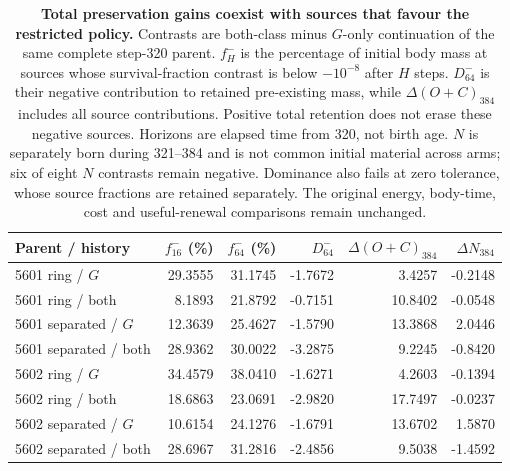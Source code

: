 \begin{table}[htbp]
\centering\small
\setlength{\tabcolsep}{4pt}
\begin{tabular}{lrrrrr}
\toprule
Parent / history & $f^-_{16}$ (\%) & $f^-_{64}$ (\%) & $D^-_{64}$ & $\Delta(O+C)_{384}$ & $\Delta N_{384}$ \\
\midrule
5601 ring / $G$ & 29.3555 & 31.1745 & -1.7672 & 3.4257 & -0.2148 \\
5601 ring / both & 8.1893 & 21.8792 & -0.7151 & 10.8402 & -0.0548 \\
5601 separated / $G$ & 12.3639 & 25.4627 & -1.5790 & 13.3868 & 2.0446 \\
5601 separated / both & 28.9362 & 30.0022 & -3.2875 & 9.2245 & -0.8420 \\
5602 ring / $G$ & 34.4579 & 38.0410 & -1.6271 & 4.2603 & -0.1394 \\
5602 ring / both & 18.6863 & 23.0691 & -2.9820 & 17.7497 & -0.0237 \\
5602 separated / $G$ & 10.6154 & 24.1276 & -1.6791 & 13.6702 & 1.5870 \\
5602 separated / both & 28.6967 & 31.2816 & -2.4856 & 9.5038 & -1.4592 \\
\bottomrule
\end{tabular}
\caption{\textbf{Total preservation gains coexist with sources that favour the restricted policy.} Contrasts are both-class minus $G$-only continuation of the same complete step-320 parent. $f^-_H$ is the percentage of initial body mass at sources whose survival-fraction contrast is below $-10^{-8}$ after $H$ steps. $D^-_{64}$ is their negative contribution to retained pre-existing mass, while $\Delta(O+C)_{384}$ includes all source contributions. Positive total retention does not erase these negative sources. Horizons are elapsed time from 320, not birth age. $N$ is separately born during 321--384 and is not common initial material across arms; six of eight $N$ contrasts remain negative. Dominance also fails at zero tolerance, whose source fractions are retained separately. The original energy, body-time, cost and useful-renewal comparisons remain unchanged.}
\label{tab:paired-material-fate}
\end{table}
